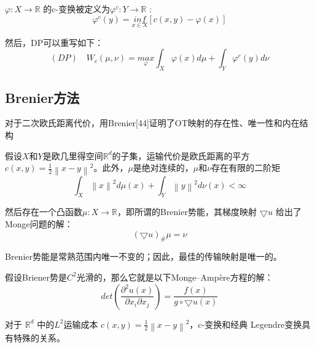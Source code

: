\begin{definition}[c-转换]	\label{definition:3.3}
	$\varphi: X\to \mathbb{R}$ 的c-变换被定义为$\varphi ^ c: Y \to \mathbb{R}$ :
	\begin{equation}
			\varphi ^c(y)= \underset{x \in X }{inf}\left [ c(x,y)-\varphi(x) \right ]
		\label{function:9}
	\end{equation}
	   
	然后，DP可以重写如下：
	\begin{equation}
		(DP) \quad W_c(\mu , \nu) = \underset{\varphi }{max} \int_X \varphi (x)d\mu +\int _Y \varphi ^c (y)d\nu
		\label{function:10}
	\end{equation}
\end{definition}

\subsection{Brenier方法}

对于二次欧氏距离代价，用Brenier[44]证明了OT映射的存在性、唯一性和内在结构
\begin{theorem}[Brenier【44】]	\label{theorem:3.1}
	假设$X$和$Y$是欧几里得空间$\mathbb{R}^d$的子集，运输代价是欧氏距离的平方$c(x,y)=\frac{1}{2}\left \| x-y \right \| ^2 $。此外，$\mu$是绝对连续的，$\mu$和$\nu$存在有限的二阶矩
	\begin{equation}
		\int _X \left \| x \right \| ^2 d\mu(x) + \int _Y \left \| y \right \| ^2 d\nu(x) < \infty 
		\label{function:11}
	\end{equation}
	
	然后存在一个凸函数$\mu : X \to \mathbb{R}$，即所谓的Brenier势能，其梯度映射 $\bigtriangledown  u$ 给出了Monge问题的解：
	\begin{equation}
		(\bigtriangledown  u)_{\#} \mu = \nu
		\label{function:12}
	\end{equation}

	 Brenier势能是常熟范围内唯一不变的；因此，最佳的传输映射是唯一的。
	 
	 假设Briener势是$C^2$光滑的，那么它就是以下Monge–Ampère方程的解：
	 \begin{equation}
	 	det(\frac{\partial ^2 u(x)}{\partial x_i \partial x_j})=\frac{f(x)}{g \circ \bigtriangledown  u(x)}
	 	\label{function:13}
	 \end{equation}
 
	对于 $\mathbb{R}^d$ 中的$L^2$运输成本 $c(x,y)=\frac{1}{2} \left \| x-y \right \|^2  $，c-变换和经典 Legendre变换具有特殊的关系。
\end{theorem}

